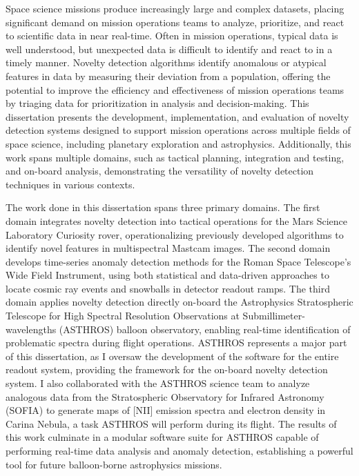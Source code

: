 Space science missions produce increasingly large and complex datasets, placing significant demand on mission operations teams to analyze, prioritize, and react to scientific data in near real-time.
Often in mission operations, typical data is well understood, but unexpected data is difficult to identify and react to in a timely manner.
Novelty detection algorithms identify anomalous or atypical features in data by measuring their deviation from a population, offering the potential to improve the efficiency and effectiveness of mission operations teams by triaging data for prioritization in analysis and decision-making.
This dissertation presents the development, implementation, and evaluation of novelty detection systems designed to support mission operations across multiple fields of space science, including planetary exploration and astrophysics.
Additionally, this work spans multiple domains, such as tactical planning, integration and testing, and on-board analysis, demonstrating the versatility of novelty detection techniques in various contexts.

The work done in this dissertation spans three primary domains. 
The first domain integrates novelty detection into tactical operations for the Mars Science Laboratory Curiosity rover, operationalizing previously developed algorithms to identify novel features in multispectral Mastcam images.
The second domain develops time-series anomaly detection methods for the Roman Space Telescope's Wide Field Instrument, using both statistical and data-driven approaches to locate cosmic ray events and snowballs in detector readout ramps.
The third domain applies novelty detection directly on-board the Astrophysics Stratospheric Telescope for High Spectral Resolution Observations at Submillimeter-wavelengths (ASTHROS) balloon observatory, enabling real-time identification of problematic spectra during flight operations.
ASTHROS represents a major part of this dissertation, as I oversaw the development of the software for the entire readout system, providing the framework for the on-board novelty detection system.
I also collaborated with the ASTHROS science team to analyze analogous data from the Stratospheric Observatory for Infrared Astronomy (SOFIA) to generate maps of [NII] emission spectra and electron density in Carina Nebula, a task ASTHROS will perform during its flight.
The results of this work culminate in a modular software suite for ASTHROS capable of performing real-time data analysis and anomaly detection, establishing a powerful tool for future balloon-borne astrophysics missions.